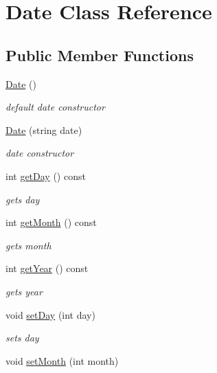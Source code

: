 \hypertarget{class_date}{}\section{Date Class Reference}
\label{class_date}
\subsection*{Public Member Functions}
\begin{DoxyCompactItemize}
\item 
\hypertarget{class_date_a4e59ed4ba66eec61c27460c5d09fa1bd}{}\label{class_date_a4e59ed4ba66eec61c27460c5d09fa1bd} 
\hyperlink{class_date_a4e59ed4ba66eec61c27460c5d09fa1bd}{Date} ()
\begin{DoxyCompactList}\small\item\em default date constructor \end{DoxyCompactList}\item 
\hyperlink{class_date_a5532efafed41fd5f8e013a61313200dc}{Date} (string date)
\begin{DoxyCompactList}\small\item\em date constructor \end{DoxyCompactList}\item 
int \hyperlink{class_date_a0f253815240e70f4c39cb93cc68bd3f4}{get\+Day} () const
\begin{DoxyCompactList}\small\item\em gets day \end{DoxyCompactList}\item 
int \hyperlink{class_date_a332f6e3a2f6a40d73742b6dab7be0f64}{get\+Month} () const
\begin{DoxyCompactList}\small\item\em gets month \end{DoxyCompactList}\item 
int \hyperlink{class_date_a8b0869f34c2b38d108ab83ee2e770e5d}{get\+Year} () const
\begin{DoxyCompactList}\small\item\em gets year \end{DoxyCompactList}\item 
void \hyperlink{class_date_a2f97b9d1ac5ef0ef6b6cab3335c5303d}{set\+Day} (int day)
\begin{DoxyCompactList}\small\item\em sets day \end{DoxyCompactList}\item 
void \hyperlink{class_date_a23aa56014dd581d691607df5d4474f64}{set\+Month} (int month)

\end{DoxyCompactItemize}
